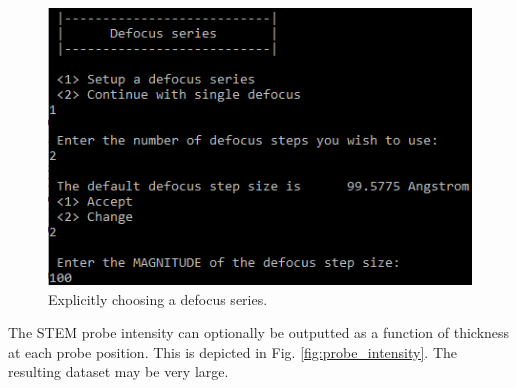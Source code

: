 \documentclass[12pt,a4paper]{article}
\begin{document}
\begin{figure}[!h]
\begin{center}
    \includegraphics[scale=0.75]{cb_abs_defocus.png}
\caption{Explicitly choosing a defocus series.}
\label{fig:cb_abs_defocus}
\end{center}
\end{figure}



The STEM probe intensity can optionally be outputted as a function of thickness at each probe position.
This is depicted in Fig. \ref{fig:probe_intensity}.
The resulting dataset may be very large.
\end{document}
